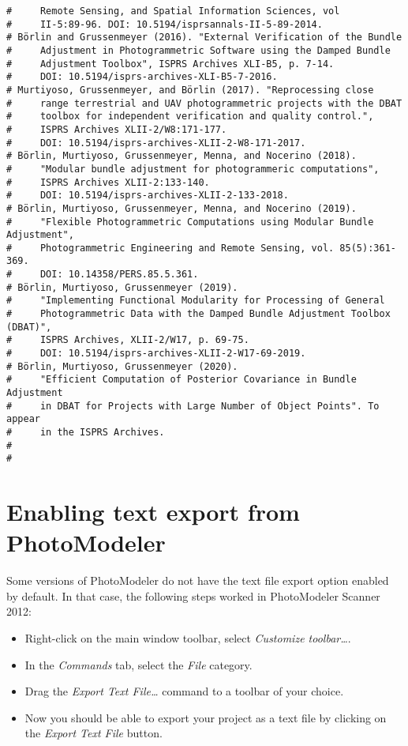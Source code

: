 \documentclass{article}
\begin{document}
\begin{verbatim}
#     Remote Sensing, and Spatial Information Sciences, vol
#     II-5:89-96. DOI: 10.5194/isprsannals-II-5-89-2014.
# Börlin and Grussenmeyer (2016). "External Verification of the Bundle
#     Adjustment in Photogrammetric Software using the Damped Bundle
#     Adjustment Toolbox", ISPRS Archives XLI-B5, p. 7-14.
#     DOI: 10.5194/isprs-archives-XLI-B5-7-2016.
# Murtiyoso, Grussenmeyer, and Börlin (2017). "Reprocessing close
#     range terrestrial and UAV photogrammetric projects with the DBAT
#     toolbox for independent verification and quality control.",
#     ISPRS Archives XLII-2/W8:171-177.
#     DOI: 10.5194/isprs-archives-XLII-2-W8-171-2017.
# Börlin, Murtiyoso, Grussenmeyer, Menna, and Nocerino (2018).
#     "Modular bundle adjustment for photogrammeric computations",
#     ISPRS Archives XLII-2:133-140.
#     DOI: 10.5194/isprs-archives-XLII-2-133-2018.
# Börlin, Murtiyoso, Grussenmeyer, Menna, and Nocerino (2019).
#     "Flexible Photogrammetric Computations using Modular Bundle Adjustment",
#     Photogrammetric Engineering and Remote Sensing, vol. 85(5):361-369.
#     DOI: 10.14358/PERS.85.5.361.
# Börlin, Murtiyoso, Grussenmeyer (2019).
#     "Implementing Functional Modularity for Processing of General
#     Photogrammetric Data with the Damped Bundle Adjustment Toolbox (DBAT)",
#     ISPRS Archives, XLII-2/W17, p. 69-75.
#     DOI: 10.5194/isprs-archives-XLII-2-W17-69-2019.
# Börlin, Murtiyoso, Grussenmeyer (2020).
#     "Efficient Computation of Posterior Covariance in Bundle Adjustment
#     in DBAT for Projects with Large Number of Object Points". To appear
#     in the ISPRS Archives.
#
#
\end{verbatim}

\section{Enabling text export from PhotoModeler}
\label{sec:enableTextExport}
Some versions of PhotoModeler do not have the text file export option
enabled by default. In that case, the following steps worked in
PhotoModeler Scanner 2012:

\begin{itemize}
\item Right-click on the main window toolbar, select \emph{Customize
toolbar\ldots{}}.
\item In the \emph{Commands} tab, select the \emph{File} category.
\item Drag the \emph{Export Text File\ldots{}} command to a toolbar of your choice.
\item Now you should be able to export your project as a text file by
clicking on the \emph{Export Text File} button.
\end{itemize}
\end{document}
